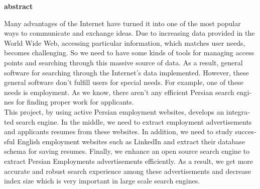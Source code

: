 

\pagestyle{empty}

\begin{latin}

\EnglishAbstractFont

\begin{center}
\textbf{abstract}
\end{center}

Many advantages of the Internet have turned it into one of the most popular ways to communicate and exchange ideas. Due to increasing data provided in the World Wide Web, accessing particular information, which matches user needs, becomes challenging. So we need to have some kinds of tools for managing access points and searching through this massive source of data. As a result, general software for searching through the Internet's data implemented. However, these general software don't fulfill users for special needs. For example, one of these needs is employment. As we know, there aren’t any efficient Persian search engines for finding proper work for applicants.
\\
This project, by using active Persian employment websites, develops an integrated search engine. In the middle, we need to extract employment advertisements and applicants resumes from these websites. In addition, we need to study successful English employment websites such as LinkedIn and extract their database schema for saving resumes. Finally, we enhance an open source search engine to extract Persian Employments advertisements efficiently. As a result, we get more accurate and robust search experience among these advertisements and decrease index size which is very important in large scale search engines.

\end{latin}

\newpage
